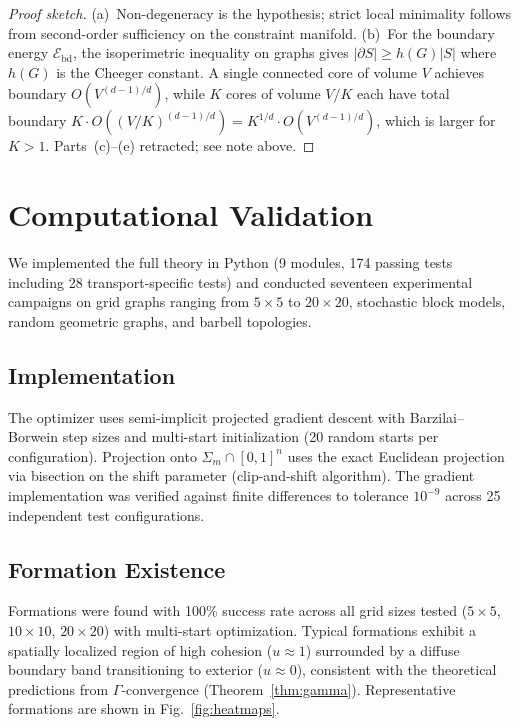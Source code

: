 \documentclass[lettersize,journal]{IEEEtran}
\begin{document}
\begin{proof}[Proof sketch]
(a)~Non-degeneracy is the hypothesis; strict local minimality follows from second-order sufficiency on the constraint manifold. (b)~For the boundary energy $\mathcal{E}_{\mathrm{bd}}$, the isoperimetric inequality on graphs gives $|\partial S| \geq h(G)|S|$ where $h(G)$ is the Cheeger constant. A single connected core of volume $V$ achieves boundary $O(V^{(d-1)/d})$, while $K$ cores of volume $V/K$ each have total boundary $K \cdot O((V/K)^{(d-1)/d}) = K^{1/d} \cdot O(V^{(d-1)/d})$, which is larger for $K > 1$. Parts~(c)--(e) retracted; see note above.
\end{proof}

\section{Computational Validation}
\label{sec:experiments}

We implemented the full theory in Python (9 modules, 174 passing tests including 28 transport-specific tests) and conducted seventeen experimental campaigns on grid graphs ranging from $5 \times 5$ to $20 \times 20$, stochastic block models, random geometric graphs, and barbell topologies.

\subsection{Implementation}

The optimizer uses semi-implicit projected gradient descent with Barzilai--Borwein step sizes and multi-start initialization (20 random starts per configuration). Projection onto $\Sigma_m \cap [0,1]^n$ uses the exact Euclidean projection via bisection on the shift parameter (clip-and-shift algorithm). The gradient implementation was verified against finite differences to tolerance $10^{-9}$ across 25 independent test configurations.

\subsection{Formation Existence}

Formations were found with 100\% success rate across all grid sizes tested ($5 \times 5$, $10 \times 10$, $20 \times 20$) with multi-start optimization. Typical formations exhibit a spatially localized region of high cohesion ($u \approx 1$) surrounded by a diffuse boundary band transitioning to exterior ($u \approx 0$), consistent with the theoretical predictions from $\Gamma$-convergence (Theorem~\ref{thm:gamma}). Representative formations are shown in Fig.~\ref{fig:heatmaps}.
\end{document}
